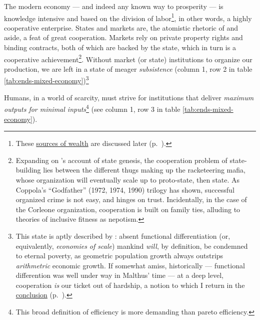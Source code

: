 The modern economy --- and indeed any known way to prosperity --- is knowledge intensive and based on the division of labor\footnote
	{These \hyperref[sec:sources-of-wealth]{sources of wealth} are discussed later (p.~\pageref{sec:sources-of-wealth}).},
in other words, a highly cooperative enterprise. States and markets are, the atomistic rhetoric of \citeauthor{Hobbes-1651-aa} and \citeauthor{Smith-1776-lq} aside, a feat of great cooperation. Markets rely on private property rights and binding contracts, both of which are backed by the state, which in turn is a cooperative achievement\footnote{
	Expanding on \citeauthor{Tilly-1985-aa}'s account of state genesis, the cooperation problem of state-building lies between the different thugs making up the racketeering mafia, whose organization will eventually scale up to proto-state, then state. As Coppola's ``Godfather'' (1972, 1974, 1990) trilogy has shown, successful organized crime is not easy, and hinges on trust. Incidentally, in the case of the Corleone organization, cooperation is built on family ties, alluding to theories of inclusive fitness as nepotism.}.
Without market (or state) institutions to organize our production, we are left in a state of meager \emph{subsistence} (column 1, row 2 in table \ref{tab:ends-mixed-economy})\footnote
	{This state is aptly described by \cite{Malthus1798}: absent functional differentiation (or, equivalently, \emph{economies of scale}) mankind \emph{will}, by definition, be condemned to eternal poverty, as geometric population growth always outstrips \emph{arithmetric} economic growth. If somewhat amiss, historically --- functional differention was well under way in Malthus' time --- at a deep level, cooperation \emph{is} our ticket out of hardship, a notion to which I return in the \hyperref[sec:growthsolidarity]{conclusion} (p.~\pageref{sec:growthsolidarity}).}

Humans, in a world of scarcity, must strive for institutions that deliver \emph{maximum outputs for minimal inputs}\footnote
	{This broad definition of efficiency is more demanding than pareto efficiency.}
(see column 1, row 3 in table \ref{tab:ends-mixed-economy}).

